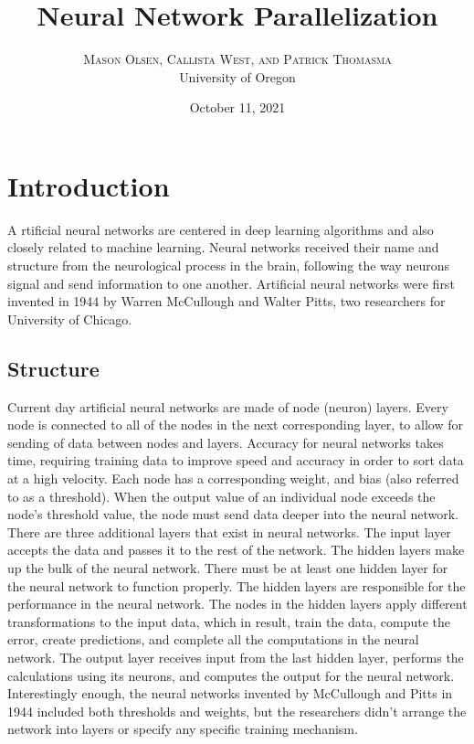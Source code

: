 \documentclass[twoside,twocolumn]{article}
\title{Neural Network Parallelization} %
\author{%
\textsc{Mason Olsen, Callista West, and Patrick Thomasma} \\[1ex] %
\normalsize University of Oregon \\ %
}
\date{October 11, 2021} %
\begin{document}
\maketitle


\section{Introduction}

\lettrine[nindent=0em,lines=3]{A}{} rtificial neural networks are centered in deep learning algorithms and also closely related to machine learning. Neural networks received their name and structure from the neurological process in the brain, following the way neurons signal and send information to one another. Artificial neural networks were first invented in 1944 by Warren McCullough and Walter Pitts, two researchers for University of Chicago.

\subsection{Structure}
Current day artificial neural networks are made of node (neuron) layers. Every node is connected to all of the nodes in the next corresponding layer, to allow for sending of data between nodes and layers. Accuracy for neural networks takes time, requiring training data to improve speed and accuracy in order to sort data at a high velocity. Each node has a corresponding weight,  and bias (also referred to as a threshold). When the output value of an individual node exceeds the node’s threshold value, the node must send data deeper into the neural network. There are three additional layers that exist in neural networks. The input layer accepts the data and passes it to the rest of the network. The hidden layers make up the bulk of the neural network. There must be at least one hidden layer for the neural network to function properly. The hidden layers are responsible for the performance in the neural network. The nodes in the hidden layers apply different transformations to the input data, which in result, train the data, compute the error, create predictions, and complete all the computations in the neural network. The output layer receives input from the last hidden layer, performs the calculations using its neurons, and computes the output for the neural network. Interestingly enough, the neural networks invented by McCullough and Pitts in 1944 included both thresholds and weights, but the researchers didn’t arrange the network into layers or specify any specific training mechanism.\\
\end{document}
